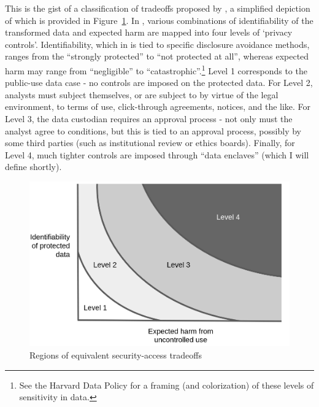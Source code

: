 This is the gist of a classification of tradeoffs proposed by \cite{altman_towards_2015},  a simplified depiction of which is provided in Figure~\ref{fig:altman-2015-mod}. In \cite{altman_towards_2015}, various combinations of identifiability of the transformed data and expected harm are mapped into four levels of `privacy controls'. Identifiability, which in \cite{altman_towards_2015} is tied to specific disclosure avoidance methods, ranges from the ``strongly protected'' to ``not protected at all'', whereas expected harm may range from ``negligible'' to ``catastrophic''.\footnote{See  the Harvard Data Policy  \cite{harvard_university_data_nodate} for a framing (and colorization) of these levels of sensitivity in data.}
  Level 1 corresponds to the public-use data case - no controls are imposed on the protected data. For Level 2, analysts must subject themselves, or are subject to by virtue of the legal environment, to terms of use, click-through agreements, notices, and the like. For Level 3, the data custodian requires an approval process - not only must the analyst agree to conditions, but this is tied to an approval process, possibly by some third parties (such as institutional review or ethics boards). Finally, for Level 4, much tighter controls are imposed through ``data enclaves'' (which I will define shortly). 

\begin{figure}
    \centering
    \includegraphics[width=\textwidth]{altman-2015-mod.png}
    \caption{Regions of equivalent security-access tradeoffs}
    \label{fig:altman-2015-mod}
\end{figure}

